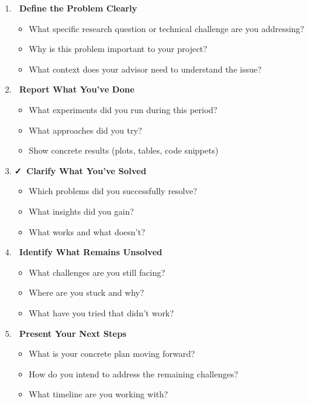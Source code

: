 \documentclass[11pt,a4paper]{article}
\begin{document}
\begin{enumerate}[leftmargin=1.5em]
    \item \textbf{\faBullseye~Define the Problem Clearly}
    \begin{itemize}
        \item What specific research question or technical challenge are you addressing?
        \item Why is this problem important to your project?
        \item What context does your advisor need to understand the issue?
    \end{itemize}

    \item \textbf{\faCheckCircle~Report What You've Done}
    \begin{itemize}
        \item What experiments did you run during this period?
        \item What approaches did you try?
        \item Show concrete results (plots, tables, code snippets)
    \end{itemize}

    \item \textbf{\faCheck~Clarify What You've Solved}
    \begin{itemize}
        \item Which problems did you successfully resolve?
        \item What insights did you gain?
        \item What works and what doesn't?
    \end{itemize}

    \item \textbf{\faTimes~Identify What Remains Unsolved}
    \begin{itemize}
        \item What challenges are you still facing?
        \item Where are you stuck and why?
        \item What have you tried that didn't work?
    \end{itemize}

    \item \textbf{\faMapSigns~Present Your Next Steps}
    \begin{itemize}
        \item What is your concrete plan moving forward?
        \item How do you intend to address the remaining challenges?
        \item What timeline are you working with?
    \end{itemize}


\end{enumerate}
\end{document}
